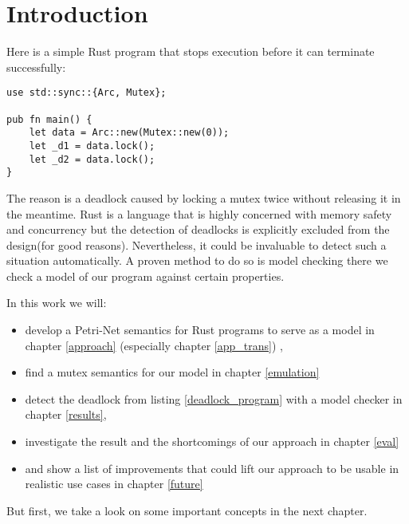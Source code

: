 \chapter{Introduction}
\label{introduction}

Here is a simple Rust\cite{klabnik2018rust} program that stops execution before it can terminate successfully:

\begin{lstlisting}
use std::sync::{Arc, Mutex};

pub fn main() {
    let data = Arc::new(Mutex::new(0));
    let _d1 = data.lock();
    let _d2 = data.lock();
}
\end{lstlisting}
The reason is a deadlock caused by locking a mutex twice without releasing it in the meantime.
Rust is a language that is highly concerned with memory safety and concurrency\cite{Matsakis:2014:RL:2692956.2663188} but the detection of deadlocks is explicitly excluded from the design\cite[Chapter 8.1]{nomicon}(for good reasons).
Nevertheless, it could be invaluable to detect such a situation automatically.
A proven method to do so is model checking\cite{baier2008principles} there we check a model of our program against certain properties.

In this work we will:
\begin{itemize}
    \item develop a Petri-Net\cite{petri1962kommunikation} semantics for Rust programs to serve as a model in chapter \ref{approach} (especially chapter \ref{app_trans}) ,
    \item find a mutex semantics for our model in chapter \ref{emulation}
    \item detect the deadlock from listing \ref{deadlock_program} with a model checker in chapter \ref{results},
    \item investigate the result and the shortcomings of our approach in chapter \ref{eval}
    \item and show a list of improvements that could lift our approach to be usable in realistic use cases in chapter \ref{future}
\end{itemize}
But first, we take a look on some important concepts in the next chapter.